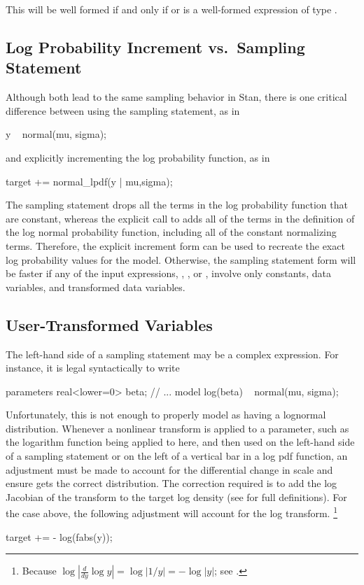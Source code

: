 This will be well formed if and only if  or  is a
well-formed expression of type .

\subsection{Log Probability Increment vs.\ Sampling Statement}

Although both lead to the same sampling behavior in Stan, there is one
critical difference between using the sampling statement, as in
%
\begin{stancode}
y ~ normal(mu, sigma);
\end{stancode}
%
and explicitly incrementing the log probability function, as in
%
\begin{stancode}
target += normal_lpdf(y | mu,sigma);
\end{stancode}
%
The sampling statement drops all the terms in the log probability
function that are constant, whereas the explicit call to
 adds all of the terms in the definition of the log
normal probability function, including all of the constant normalizing
terms.  Therefore, the explicit increment form can be used to recreate
the exact log probability values for the model.  Otherwise, the
sampling statement form will be faster if any of the input expressions,
, , or , involve only constants, data
variables, and transformed data variables.


\subsection{User-Transformed Variables}

The left-hand side of a sampling statement may be a complex
expression.  For instance, it is legal syntactically to write
%
\begin{stancode}
parameters {
  real<lower=0> beta;
}
// ...
model {
  log(beta) ~ normal(mu, sigma);
}
\end{stancode}
%
Unfortunately, this is not enough to properly model  as
having a lognormal distribution.  Whenever a nonlinear transform is
applied to a parameter, such as the logarithm function being applied
to  here, and then used on the left-hand side of a sampling
statement or on the left of a vertical bar in a log pdf function, an
adjustment must be made to account for the differential change in
scale and ensure  gets the correct distribution.  The
correction required is to add the log Jacobian of the transform to the
target log density (see  for full
definitions).  For the case above, the following adjustment will
account for the log transform.%
%
\footnote{Because $\log | \frac{d}{dy} \log y | = \log | 1/y | = - \log
  |y|$;  see .}
%
\begin{stancode}
target += - log(fabs(y));
\end{stancode}
%

